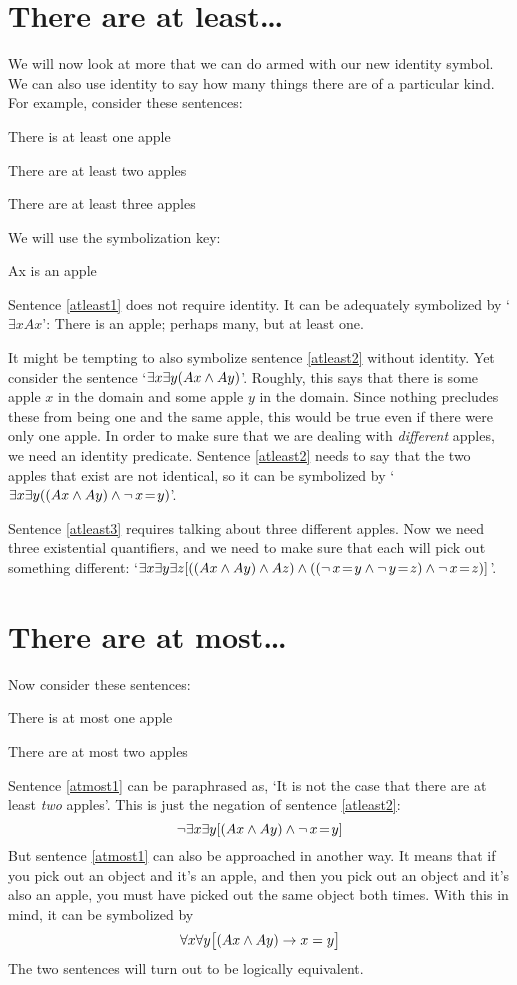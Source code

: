\section{There are at least\ldots}
We will now look at more that we can do armed with our new identity symbol. 
We can also use identity to say how many things there are of a particular kind. For example, consider these sentences:
\begin{earg}
\item[\ex{atleast1}] There is at least one apple
\item[\ex{atleast2}] There are at least two apples
\item[\ex{atleast3}] There are at least three apples
\end{earg}
We will use the symbolization key:
	\begin{ekey}
		\item[Ax]  is an apple
	\end{ekey}
Sentence \ref{atleast1} does not require identity. It can be adequately symbolized by `$\exists x Ax$': There is an apple; perhaps many, but at least one.

It might be tempting to also symbolize sentence \ref{atleast2} without identity. Yet consider the sentence `$\exists x \exists y(Ax \wedge Ay)$'. Roughly, this says that there is some apple $x$ in the domain and some apple $y$ in the domain. Since nothing precludes these from being one and the same apple, this would be true even if there were only one apple. In order to make sure that we are dealing with \emph{different} apples, we need an identity predicate. Sentence \ref{atleast2} needs to say that the two apples that exist are not identical, so it can be symbolized by `$\exists x \exists y((Ax \wedge Ay) \wedge \neg\, x\!=\! y)$'.

Sentence \ref{atleast3} requires talking about three different apples. Now we need three existential quantifiers, and we need to make sure that each will pick out something different: `$\exists x \exists y\exists z[((Ax \wedge Ay) \wedge Az) \wedge ((\neg\, x\!=\! y \wedge \neg\, y\!=\! z) \wedge \neg\, x\!=\! z)]$'.

\section{There are at most\ldots}
Now consider these sentences:
\begin{earg}
	\item[\ex{atmost1}] There is at most one apple
	\item[\ex{atmost2}] There are at most two apples
\end{earg}
Sentence \ref{atmost1} can be paraphrased as, `It is not the case that there are at least \emph{two} apples'. This is just the negation of sentence \ref{atleast2}: 
$$\neg \exists x \exists y[(Ax \wedge Ay) \wedge \neg\, x\!=\! y]$$
But sentence \ref{atmost1} can also be approached in another way. It means that if you pick out an object and it's an apple, and then you pick out an object and it's also an apple, you must have picked out the same object both times. With this in mind, it can be symbolized by
$$\forall x\forall y\bigl[(Ax \wedge Ay) \rightarrow x=y\bigr]$$
The two sentences will turn out to be logically equivalent.

